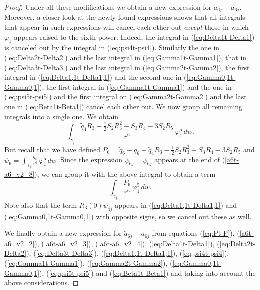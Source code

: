 \begin{proof}
Under all these modifications we obtain a new expression for $\tilde{a}_{6j}-a_{6j}$. Moreover, a closer look at the newly found expressions shows that all integrals that appear in such expressions will cancel each other out \emph{except} those in which $\varphi_1$ appears raised to the sixth power. Indeed, the integral in (\ref{eq:Delta1t-Delta1}) is canceled out by the integral in (\ref{eq:psi4t-psi4}). Similarly the one in (\ref{eq:Delta2t-Delta2}) and the last integral in (\ref{eq:Gamma1t-Gamma1}), that in (\ref{eq:Delta3t-Delta3}) and the last integral in (\ref{eq:Gamma2t-Gamma2}), the first integral in (\ref{eq:Delta1,1t-Delta1,1}) and the second one in (\ref{eq:Gamma0,1t-Gamma0,1}), the first integral in (\ref{eq:Gamma1t-Gamma1}) and the one in (\ref{eq:psi5t-psi5}) and the first integral on (\ref{eq:Gamma2t-Gamma2}) and the last one in (\ref{eq:Beta1t-Beta1}) cancel each other out. We now group all remaining integrals into a single one. We obtain
\[ \int_{\gamma_j}\frac{\tilde{q}_4R_3-\frac{1}{2}S_2R_3^2-S_3R_4-3S_2R_5}{r^6}\,\varphi_1^5\,dw. \]
But recall that we have defined $P_6=\tilde{q}_6-q_6+\tilde{q}_4R_3-\frac{1}{2}S_2R_3^2-S_3R_4-3S_2R_5$ and $\psi_{6}=\int_{\gamma_j}\frac{q_6}{r^6}\,\varphi_1^5\,dw$. Since the expression $\tilde{\psi}_{6j}-\psi_{6j}$ appears at the end of (\ref{a6t-a6_v2_8}), we can group it with the above integral to obtain a term
\[ \int_{\gamma_j}\frac{P_6}{r^6}\,\varphi_1^5\,dw. \]
Note also that the term $R_3(0)\tilde{\psi}_{4j}$ appears in (\ref{eq:Delta1,1t-Delta1,1}) and (\ref{eq:Gamma0,1t-Gamma0,1}) with opposite signs, so we cancel out these as well. 

We finally obtain a new expression for $\tilde{a}_{6j}-a_{6j}$ from equations (\ref{eq:Pt-P}), (\ref{a6t-a6_v2_2}), (\ref{a6t-a6_v2_3}), (\ref{a6t-a6_v2_4}), (\ref{eq:Delta1t-Delta1}), (\ref{eq:Delta2t-Delta2}), (\ref{eq:Delta3t-Delta3}), (\ref{eq:Delta1,1t-Delta1,1}), (\ref{eq:psi4t-psi4}), (\ref{eq:Gamma1t-Gamma1}), (\ref{eq:Gamma2t-Gamma2}), (\ref{eq:Gamma0,1t-Gamma0,1}), (\ref{eq:psi5t-psi5}) and (\ref{eq:Beta1t-Beta1}) and taking into account the above considerations. 


\end{proof}
